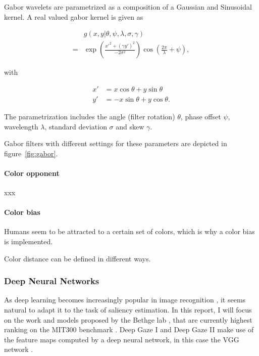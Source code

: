 \documentclass[a4paper,twocolumn,10pt]{article}
\begin{document}
Gabor wavelets are parametrized as a composition of a Gaussian and Sinusoidal kernel.
A real valued gabor kernel is given as

\begin{align*}
    &g(x,y|\theta, \psi, \lambda, \sigma, \gamma) \\
    =& \exp\left(\frac{x'^2 + (\gamma y')^2}{-2\sigma^2}\right) \cos \left(\frac{2\pi}{\lambda}+\psi\right),
\end{align*}

with

\begin{align*}
  x' &= x \cos \theta + y \sin \theta \\
  y' &= -x \sin \theta + y \cos \theta.
\end{align*}

The parametrization includes the angle (filter rotation) $\theta$, phase offset $\psi$, wavelength $\lambda$, standard deviation $\sigma$ and skew $\gamma$.

Gabor filters with different settings for these parameters are depicted in figure~\ref{fig:gabor}.

\paragraph{Color opponent}

xxx

\paragraph{Color bias}

Humans seem to be attracted to a certain set of colors, which is why a color bias is implemented.

Color distance can be defined in different ways.

\subsubsection{Deep Neural Networks}

As deep learning becomes increasingly popular in image recognition \cite{LeCun2015}, it seems natural to adapt it to the task of saliency estimation.
In this report, I will focus on the work and models proposed by the Bethge lab \cite{Kummerer2017b,Kummerer2017a,Kummerer2014}, that are currently highest ranking on the MIT300 benchmark \cite{Bylinskii2015}.
Deep Gaze I \cite{Kummerer2014} and Deep Gaze II \cite{Kummerer2017b} make use of the feature maps computed by a deep neural network, in this case the VGG network \cite{Simonyan2014}.
\end{document}
